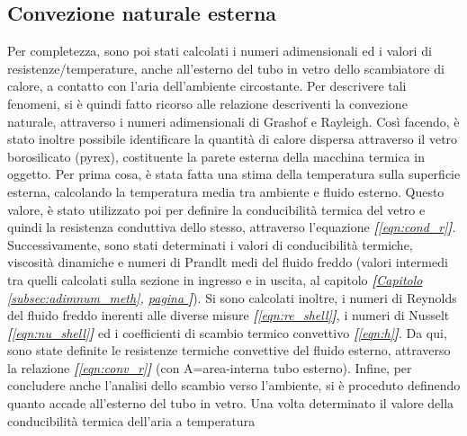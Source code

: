 \documentclass[a4paper,10pt]{article}                                                                                       %
\begin{document}
\subsection{Convezione naturale esterna}                                                                                    %
\label{subsec:extnat_conv}                                                                                                  %
  Per completezza, sono poi stati calcolati i numeri adimensionali ed i valori di resistenze/temperature, anche all'esterno
  del tubo in vetro dello scambiatore di calore, a contatto con l'aria dell'ambiente circostante. Per descrivere tali
  fenomeni, si è quindi fatto ricorso alle relazione descriventi la convezione naturale, attraverso i numeri adimensionali
  di Grashof e Rayleigh. Così facendo, è stato inoltre possibile identificare la quantità di calore dispersa attraverso il
  vetro borosilicato (pyrex), costituente la parete esterna della macchina termica in oggetto. Per prima cosa, è stata
  fatta una stima della temperatura sulla superficie esterna, calcolando la temperatura media tra ambiente e fluido
  esterno. Questo valore, è stato utilizzato poi per definire la conducibilità termica del vetro e quindi la resistenza
  conduttiva dello stesso, attraverso l'equazione \textit{\textbf{[}\ref{eqn:cond_r}\textbf{]}}. Successivamente, sono
  stati determinati i valori di conducibilità termiche, viscosità dinamiche e numeri di Prandlt medi del fluido freddo
  (valori intermedi tra quelli calcolati sulla sezione in ingresso e in uscita, al capitolo
  \textit{\textbf{[}\hyperref[subsec:adimnum_meth]{Capitolo }\ref{subsec:adimnum_meth},
  \hyperref[subsec:adimnum_meth]{pagina }\pageref{subsec:adimnum_meth}\textbf{]}}). Si sono calcolati inoltre, i numeri di
  Reynolds del fluido freddo inerenti alle diverse misure \textit{\textbf{[}\ref{eqn:re_shell}\textbf{]}}, i numeri di
  Nusselt \textit{\textbf{[}\ref{eqn:nu_shell}\textbf{]}} ed i coefficienti di scambio termico convettivo
  \textit{\textbf{[}\ref{eqn:h}\textbf{]}}. Da qui, sono state definite le resistenze termiche convettive del fluido
  esterno, attraverso la relazione \textit{\textbf{[}\ref{eqn:conv_r}\textbf{]}} (con A=area-interna tubo esterno).
  Infine, per concludere anche l'analisi dello scambio verso l'ambiente, si è proceduto definendo quanto accade
  all'esterno del tubo in vetro. Una volta determinato il valore della conducibilità termica dell'aria a temperatura
\end{document}
